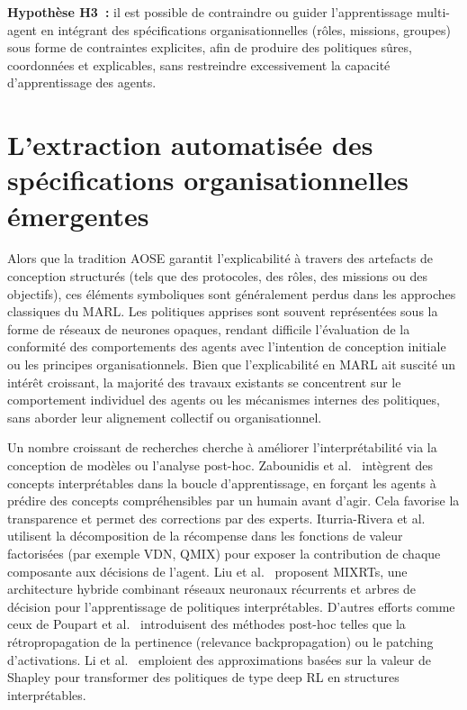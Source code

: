 \medskip

\noindent
\textbf{Hypothèse H3~:} il est possible de contraindre ou guider l'apprentissage multi-agent en intégrant des spécifications organisationnelles (rôles, missions, groupes) sous forme de contraintes explicites, afin de produire des politiques sûres, coordonnées et explicables, sans restreindre excessivement la capacité d'apprentissage des agents.






\section{L'extraction automatisée des spécifications organisationnelles émergentes}

Alors que la tradition \ac{AOSE} garantit l'explicabilité à travers des artefacts de conception structurés (tels que des protocoles, des rôles, des missions ou des objectifs), ces éléments symboliques sont généralement perdus dans les approches classiques du \ac{MARL}. Les politiques apprises sont souvent représentées sous la forme de réseaux de neurones opaques, rendant difficile l'évaluation de la conformité des comportements des agents avec l'intention de conception initiale ou les principes organisationnels. Bien que l'explicabilité en \ac{MARL} ait suscité un intérêt croissant, la majorité des travaux existants se concentrent sur le comportement individuel des agents ou les mécanismes internes des politiques, sans aborder leur alignement collectif ou organisationnel.

Un nombre croissant de recherches cherche à améliorer l'interprétabilité via la conception de modèles ou l'analyse post-hoc. Zabounidis et al.~\cite{zabounidis2023concept} intègrent des concepts interprétables dans la boucle d'apprentissage, en forçant les agents à prédire des concepts compréhensibles par un humain avant d'agir. Cela favorise la transparence et permet des corrections par des experts. Iturria-Rivera et al.~\cite{iturria2024explainable} utilisent la décomposition de la récompense dans les fonctions de valeur factorisées (par exemple VDN, QMIX) pour exposer la contribution de chaque composante aux décisions de l'agent. Liu et al.~\cite{liu2025} proposent MIXRTs, une architecture hybride combinant réseaux neuronaux récurrents et arbres de décision pour l'apprentissage de politiques interprétables. D'autres efforts comme ceux de Poupart et al.~\cite{poupart2025perspectives} introduisent des méthodes post-hoc telles que la rétropropagation de la pertinence (relevance backpropagation) ou le patching d'activations. Li et al.~\cite{li2025from} emploient des approximations basées sur la valeur de Shapley pour transformer des politiques de type deep \ac{RL} en structures interprétables.

